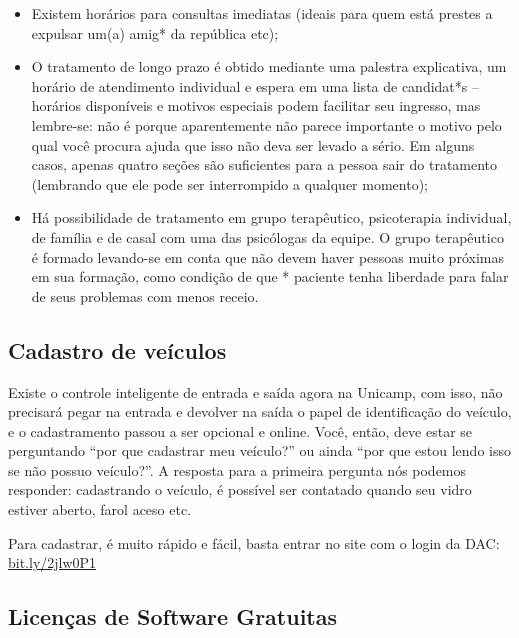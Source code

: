 \begin{itemize}
    \item  Existem horários para consultas imediatas (ideais para quem está
        prestes a expulsar um(a) amig* da república etc);

    \item  O tratamento de longo prazo é obtido mediante uma palestra
        explicativa, um horário de atendimento individual e espera em uma lista
        de candidat*s -- horários disponíveis e motivos especiais podem
        facilitar seu ingresso, mas lembre-se: não é porque aparentemente não
        parece importante o motivo pelo qual você procura ajuda que isso não
        deva ser levado a sério. Em alguns casos, apenas quatro seções são
        suficientes para a pessoa sair do tratamento (lembrando que ele pode
        ser interrompido a qualquer momento);

    \item  Há possibilidade de tratamento em grupo terapêutico, psicoterapia
        individual, de família e de casal com uma das psicólogas da equipe. O
        grupo terapêutico é formado levando-se em conta que não devem haver
        pessoas muito próximas em sua formação, como condição de que *
        paciente tenha liberdade para falar de seus problemas com menos receio.
\end{itemize}

\subsection{Cadastro de veículos}

Existe o controle inteligente de entrada e saída agora na Unicamp, com isso,
não precisará pegar na entrada e devolver na saída o papel de identificação do
veículo, e o cadastramento passou a ser opcional e online. Você, então, deve
estar se perguntando ``por que cadastrar meu veículo?'' ou ainda ``por que
estou lendo isso se não possuo veículo?''. A resposta para a primeira pergunta
nós podemos responder: cadastrando o veículo, é possível ser contatado quando
seu vidro estiver aberto, farol aceso etc.

Para cadastrar, é muito rápido e fácil, basta entrar no site com o login da
DAC: \url{bit.ly/2jlw0P1}

\subsection{Licenças de Software Gratuitas}

